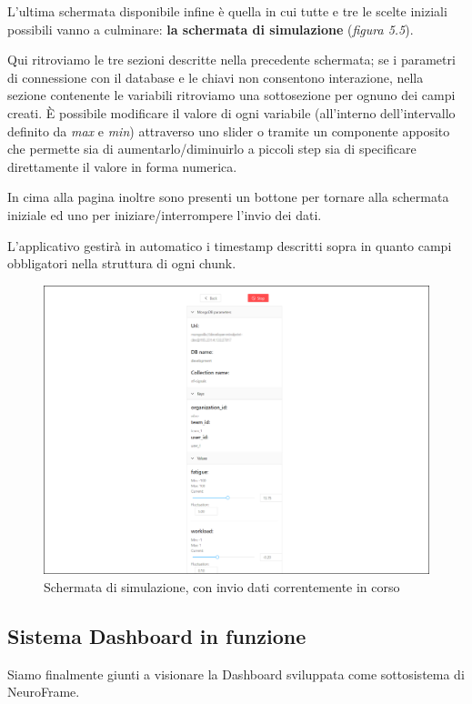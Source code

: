 L'ultima schermata disponibile infine è quella in cui tutte e tre le scelte iniziali possibili vanno a culminare: {\bf la schermata di simulazione} (\emph{figura 5.5}).\newline

\noindent Qui ritroviamo le tre sezioni descritte nella precedente schermata; se i parametri di connessione con il database e le chiavi non consentono interazione, nella sezione contenente le variabili ritroviamo una sottosezione per ognuno dei campi creati.\newline
È possibile modificare il valore di ogni variabile (all'interno dell'intervallo definito da \emph{max} e \emph{min}) attraverso uno slider o tramite un componente apposito che permette sia di aumentarlo/diminuirlo a piccoli step sia di specificare direttamente il valore in forma numerica.\newline

\noindent In cima alla pagina inoltre sono presenti un bottone per tornare alla schermata iniziale ed uno per iniziare/interrompere l'invio dei dati.

\noindent L'applicativo gestirà in automatico i timestamp descritti sopra in quanto campi obbligatori nella struttura di ogni chunk.
\vspace{2mm}
\begin{figure}[H]
    \centering
    \includegraphics[width=1.0\textwidth]{img/simulator_working_screenshot.png}
    \caption{Schermata di simulazione, con invio dati correntemente in corso}
\end{figure}
\subsection{Sistema Dashboard in funzione}
Siamo finalmente giunti a visionare la Dashboard sviluppata come sottosistema di NeuroFrame.\newline


